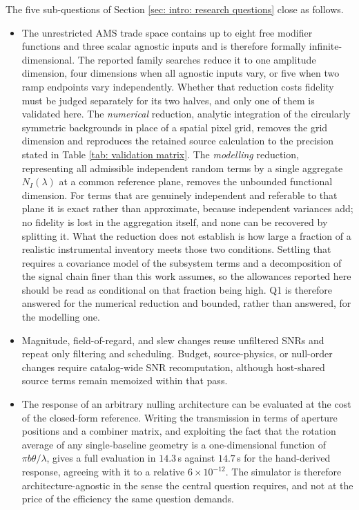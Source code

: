 \documentclass[12pt,a4paper]{article}
\numberwithin{equation}{section}
\numberwithin{figure}{section}
\numberwithin{table}{section}
\begin{document}
The five sub-questions of Section \ref{sec: intro: research questions} close as follows.
\begin{itemize}
    \item[\textbf{Q1}] The unrestricted AMS trade space contains up to eight free modifier functions and three scalar agnostic inputs and is therefore formally infinite-dimensional. The reported family searches reduce it to one amplitude dimension, four dimensions when all agnostic inputs vary, or five when two ramp endpoints vary independently. Whether that reduction costs fidelity must be judged separately for its two halves, and only one of them is validated here. The \textit{numerical} reduction, analytic integration of the circularly symmetric backgrounds in place of a spatial pixel grid, removes the grid dimension and reproduces the retained source calculation to the precision stated in Table \ref{tab: validation matrix}. The \textit{modelling} reduction, representing all admissible independent random terms by a single aggregate $N_I(\lambda)$ at a common reference plane, removes the unbounded functional dimension. For terms that are genuinely independent and referable to that plane it is exact rather than approximate, because independent variances add; no fidelity is lost in the aggregation itself, and none can be recovered by splitting it. What the reduction does not establish is how large a fraction of a realistic instrumental inventory meets those two conditions. Settling that requires a covariance model of the subsystem terms and a decomposition of the signal chain finer than this work assumes, so the allowances reported here should be read as conditional on that fraction being high. Q1 is therefore answered for the numerical reduction and bounded, rather than answered, for the modelling one.
    \item[\textbf{Q2}] Magnitude, field-of-regard, and slew changes reuse unfiltered SNRs and repeat only filtering and scheduling. Budget, source-physics, or null-order changes require catalog-wide SNR recomputation, although host-shared source terms remain memoized within that pass.
    \item[\textbf{Q3}] The response of an arbitrary nulling architecture can be evaluated at the cost of the closed-form reference. Writing the transmission in terms of aperture positions and a combiner matrix, and exploiting the fact that the rotation average of any single-baseline geometry is a one-dimensional function of $\pi b\theta/\lambda$, gives a full evaluation in $14.3$\,s against $14.7$\,s for the hand-derived response, agreeing with it to a relative $6\times10^{-12}$. The simulator is therefore architecture-agnostic in the sense the central question requires, and not at the price of the efficiency the same question demands.

\end{itemize}
\end{document}
